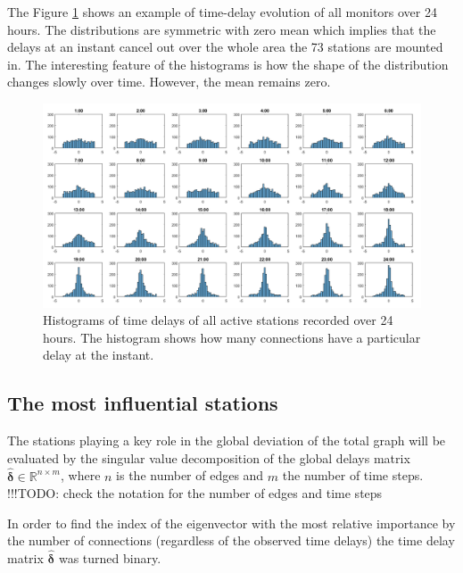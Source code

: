 \documentclass[12pt, sumlimits, intlimits]{article}
\newcommand\todo[1]{{\color{red}!!!TODO: #1}}
\begin{document}
The Figure \ref{fig:histograms} shows an example of time-delay evolution of all monitors over 24 hours. The distributions are symmetric with zero mean which implies that the delays at an instant cancel out over the whole area the 73 stations are mounted in. The interesting feature of the histograms is how the shape of the distribution changes slowly over time. However, the mean remains zero.

\begin{figure}[ht]
	\begin{center}   
		\includegraphics[width=\textwidth]{../figures/hourlydelaydistributionoverallstationsforoneday.png}
	\end{center}
	\caption{Histograms of time delays of all active stations recorded over 24 hours. The histogram shows how many connections have a particular delay at the instant.}\label{fig:histograms}
\end{figure}


\subsection{The most influential stations}

The stations playing a key role in the global deviation of the total graph will be evaluated by the singular value decomposition of the global delays matrix $\bm{\hat{\delta}} \in\mathbb{R}^{n\times m}$, where $n$ is the number of edges and $m$ the number of time steps. \todo{check the notation for the number of edges and time steps}

In order to find the index of the eigenvector with the most relative importance by the number of connections (regardless of the observed time delays) the time delay matrix $\bm{\hat{\delta}}$ was turned binary.
\end{document}
